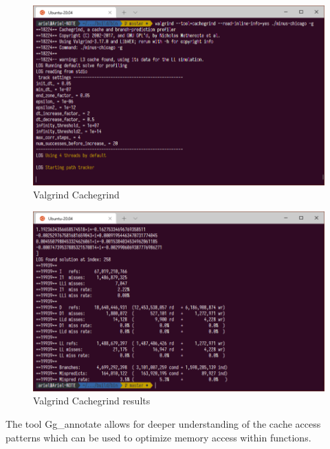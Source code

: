 \begin{figure}[H]
    \includegraphics[width=\columnwidth]{figs/valgrind_cachegrind}
    \caption{Valgrind Cachegrind}
\end{figure}
\begin{figure}[H]
    \includegraphics[width=\columnwidth]{figs/valgrind_cachegrind_results}
    \caption{Valgrind Cachegrind results}
\end{figure}

The tool Gg\_annotate allows for deeper understanding of the cache access
patterns which can be used to optimize memory access within functions.

